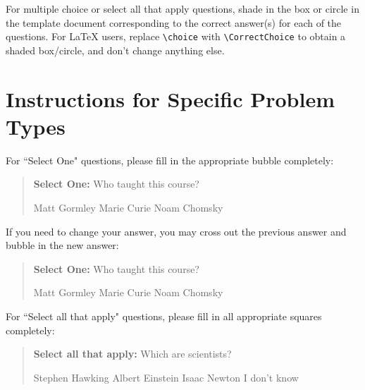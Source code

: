 \documentclass[11pt,addpoints,answers]{exam}
\newcommand{\blackcircle}{\tikz\draw[black,fill=black] (0,0) circle (1ex);}
\begin{document}

For multiple choice or select all that apply questions, shade in the box or circle in the template document corresponding to the correct answer(s) for each of the questions. For \LaTeX{} users, replace \lstinline{\choice} with \lstinline{\CorrectChoice} to obtain a shaded box/circle, and don't change anything else.\clearpage

\section*{Instructions for Specific Problem Types}

For ``Select One" questions, please fill in the appropriate bubble completely:

\begin{quote}
\textbf{Select One:} Who taught this course?
    \begin{checkboxes}
     \CorrectChoice Matt Gormley
     \choice Marie Curie
     \choice Noam Chomsky
    \end{checkboxes}
\end{quote}

If you need to change your answer, you may cross out the previous answer and bubble in the new answer:

\begin{quote}
\textbf{Select One:} Who taught this course?
    {
    \begin{checkboxes}
     \CorrectChoice Matt Gormley
     \choice Marie Curie \checkboxchar{\xcancel{\blackcircle}{}}
     \choice Noam Chomsky
    \end{checkboxes}
    }
\end{quote}

For ``Select all that apply" questions, please fill in all appropriate squares completely:

\begin{quote}
\textbf{Select all that apply:} Which are scientists?
    {%
    \checkboxchar{$\Box$} \checkedchar{$\blacksquare$} %
    \begin{checkboxes}
    \CorrectChoice Stephen Hawking 
    \CorrectChoice Albert Einstein
    \CorrectChoice Isaac Newton
    \choice I don't know
    \end{checkboxes}
    }
\end{quote}
\end{document}
